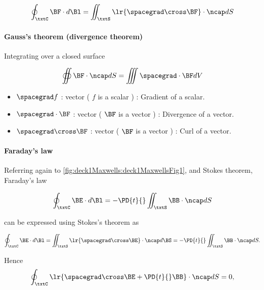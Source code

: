 \begin{dmath}\label{eqn:uwavesLecture1:140}
\oint_\txtC \BF \cdot d\Bl = \iint_\txtS \lr{ \spacegrad \cross \BF } \cdot \ncap dS
\end{dmath}

\paragraph{Gauss's theorem (divergence theorem)}

Integrating over a closed surface

\begin{dmath}\label{eqn:uwavesLecture1:160}
\oiint \BF \cdot \ncap dS = \iiint \spacegrad \cdot \BF dV
\end{dmath}

\begin{itemize}
\item \( \spacegrad f \) :  vector ( \( f \) is a scalar ) : Gradient of a scalar.
\item \( \spacegrad \cdot \BF \) :  vector ( \( \BF \) is a vector ) : Divergence of a vector.
\item \( \spacegrad \cross \BF \) :  vector ( \( \BF \) is a vector ) : Curl of a vector.
\end{itemize}

\paragraph{Faraday's law}

Referring again to \cref{fig:deck1Maxwells:deck1MaxwellsFig1}, and Stokes theorem, Faraday's law

\begin{dmath}\label{eqn:uwavesLecture1:180}
\oint_\txtC \BE \cdot d\Bl = - \PD{t}{} \iint_\txtS \BB \cdot \ncap dS
\end{dmath}

can be expressed using Stokes's theorem as

\begin{dmath}\label{eqn:uwavesLecture1:200}
\oint_\txtC \BE \cdot d\Bl = \iint_\txtS \lr{ \spacegrad \cross \BE} \cdot \ncap d\BS
=
- \PD{t}{} \iint_\txtS \BB \cdot \ncap dS.
\end{dmath}

Hence
\begin{dmath}\label{eqn:uwavesLecture1:220}
\oint_\txtC 
\lr{
\spacegrad \cross \BE
+ \PD{t}{} \BB 
}
\cdot \ncap dS
= 0,
\end{dmath}

